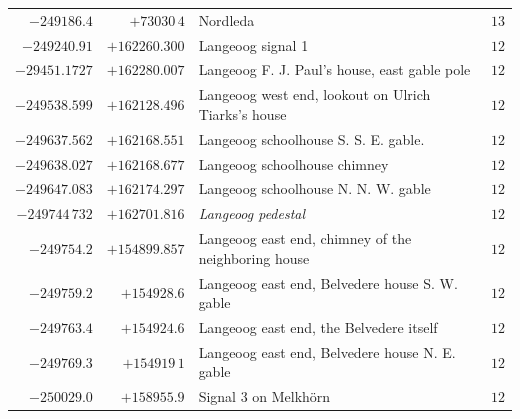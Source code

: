\begin{center}
\begin{tabular}{r|r|p{170pt}|r}
\(-249186.4\)&\(+73030\,4\)&Nordleda&\(13\)\\
\(-249240.91\)&\(+162260.300\)&Langeoog signal 1&\(12\)\\
\(-29451.1727\)&\(+162280.007\)&Langeoog F. J. Paul’s house, east gable pole&\(12\)\\
\(-249538.599\)&\(+162128.496\)&Langeoog west end, lookout on Ulrich Tiarks’s house&\(12\)\\
\(-249637.562\)&\(+162168.551\)&Langeoog schoolhouse S. S. E. gable.&\(12\)\\
\(-249638.027\)&\(+162168.677\)&Langeoog schoolhouse chimney&\(12\)\\
\(-249647.083\)&\(+162174.297\)&Langeoog schoolhouse N. N. W. gable&\(12\)\\
\(-249744\,732\)&\(+162701.816\)&\textit{Langeoog pedestal}&\(12\)\\
\(-249754.2\)&\(+154899.857\)&Langeoog east end, chimney of the neighboring house&\(12\)\\
\(-249759.2\)&\(+154928.6\)&Langeoog east end, Belvedere house S. W. gable&\(12\)\\
\(-249763.4\)&\(+154924.6\)&Langeoog east end, the Belvedere itself&\(12\)\\
\(-249769.3\)&\(+154919\,1\)&Langeoog east end, Belvedere house N. E. gable&\(12\)\\
\(-250029.0\)&\(+158955.9\)&Signal 3 on Melkhörn&\(12\)\\
\hline\end{tabular}\endgroup\end{center}
\clearpage
